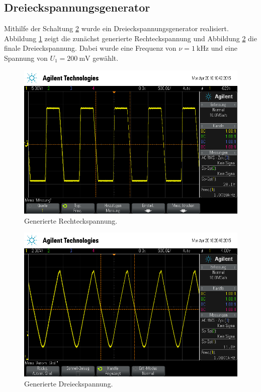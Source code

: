 \subsection{Dreieckspannungsgenerator} %
\label{sub:dreiecksgenerator}

Mithilfe der Schaltung \ref{fig:dreieck} wurde ein Dreieckspannungsgenerator realisiert.
Abbildung \ref{fig:rechteck} zeigt die zunächst generierte Rechteckspannung und Abbildung \ref{fig:dreieck} die finale Dreieckspannung.
Dabei wurde eine Frequenz von $\nu = \SI{1}{\kilo\hertz}$ und eine Spannung von $U_1 = \SI{200}{\milli\volt}$ gewählt.

\begin{figure}[!h]
    \centering
    \includegraphics[width=0.8\linewidth]{data/scope_13.png}
    \caption{Generierte Rechteckspannung.}
    \label{fig:rechteck}
\end{figure}

\begin{figure}[!h]
    \centering
    \includegraphics[width=0.8\linewidth]{data/scope_14.png}
    \caption{Generierte Dreieckspannung.}
    \label{fig:dreieck}
\end{figure}

